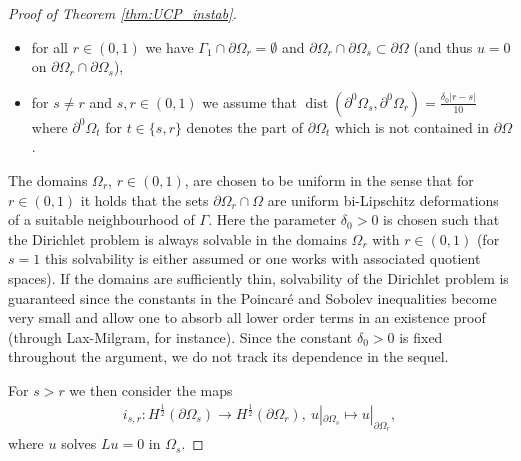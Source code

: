 \documentclass[12pt,twoside]{amsart}
\numberwithin{equation}{section}
\DeclareMathOperator {\dist} {dist}
\begin{document}
\begin{proof}[Proof of Theorem \ref{thm:UCP_instab}]
\begin{itemize}
\item for all $r\in (0,1)$ we have $\Gamma_1 \cap \partial \Omega_r = \emptyset$ and $\partial \Omega_r \cap \partial \Omega_s \subset \partial \Omega$ (and thus $u= 0$ on $\partial \Omega_r \cap \partial \Omega_s$),
\item for $s\neq r$ and $s,r\in (0,1)$ we assume that $\dist(\partial^0 \Omega_s, \partial^0 \Omega_r) =\frac{\delta_0 |r-s|}{10}$ where $\partial^0 \Omega_t$ for $t\in \{s,r\}$ denotes the part of $\partial \Omega_t$ which is not contained in $\partial \Omega$.  
\end{itemize}
The domains $\Omega_r$, $r\in (0,1)$, are chosen to be uniform in the sense that for $r\in (0,1)$ it holds that the sets $\partial \Omega_r \cap \Omega$ are uniform bi-Lipschitz deformations of a suitable neighbourhood of $\Gamma$.
Here the parameter $\delta_0>0$ is chosen such that the Dirichlet problem is always solvable in the domains $\Omega_r$ with $r\in (0,1)$ (for $s=1$ this solvability is either assumed or one works with associated quotient spaces). If the domains are sufficiently thin, solvability of the Dirichlet problem is guaranteed since the constants in the Poincar\'e and Sobolev inequalities become very small and allow one to absorb all lower order terms in an existence proof (through Lax-Milgram, for instance). Since the constant $\delta_0>0$ is fixed throughout the argument, we do not track its dependence in the sequel.


For $s>r$ we then consider the maps
\begin{align*}
i_{s,r}: H^{\frac{1}{2}}(\partial \Omega_s) \rightarrow H^{\frac{1}{2}}(\partial \Omega_r), \ u|_{\partial \Omega_s} \mapsto u|_{\partial \Omega_r},
\end{align*}
where $u$ solves $Lu = 0$ in $\Omega_s$. 


\bigskip





\end{proof}
\end{document}
